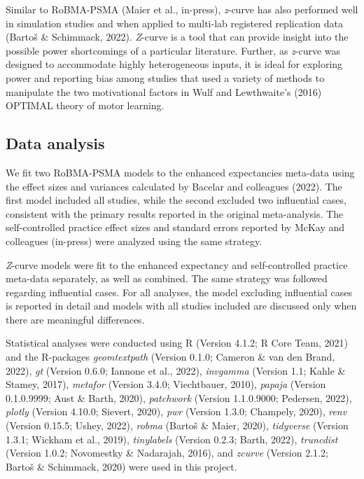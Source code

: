 \documentclass[
  doc, donotrepeattitle,floatsintext]{apa7}
\begin{document}
Similar to RoBMA-PSMA (Maier et al., in-press), \emph{z}-curve has also performed well in simulation studies and when applied to multi-lab registered replication data (Bartoš \& Schimmack, 2022). \emph{Z}-curve is a tool that can provide insight into the possible power shortcomings of a particular literature. Further, as \emph{z}-curve was designed to accommodate highly heterogeneous inputs, it is ideal for exploring power and reporting bias among studies that used a variety of methods to manipulate the two motivational factors in Wulf and Lewthwaite's (2016) OPTIMAL theory of motor learning.

\hypertarget{data-analysis}{%
\subsection{Data analysis}\label{data-analysis}}

We fit two RoBMA-PSMA models to the enhanced expectancies meta-data using the effect sizes and variances calculated by Bacelar and colleagues (2022). The first model included all studies, while the second excluded two influential cases, consistent with the primary results reported in the original meta-analysis. The self-controlled practice effect sizes and standard errors reported by McKay and colleagues (in-press) were analyzed using the same strategy.

\emph{Z}-curve models were fit to the enhanced expectancy and self-controlled practice meta-data separately, as well as combined. The same strategy was followed regarding influential cases. For all analyses, the model excluding influential cases is reported in detail and models with all studies included are discussed only when there are meaningful differences.

Statistical analyses were conducted using R (Version 4.1.2; R Core Team, 2021) and the R-packages \emph{geomtextpath} (Version 0.1.0; Cameron \& van den Brand, 2022), \emph{gt} (Version 0.6.0; Iannone et al., 2022), \emph{invgamma} (Version 1.1; Kahle \& Stamey, 2017), \emph{metafor} (Version 3.4.0; Viechtbauer, 2010), \emph{papaja} (Version 0.1.0.9999; Aust \& Barth, 2020), \emph{patchwork} (Version 1.1.0.9000; Pedersen, 2022), \emph{plotly} (Version 4.10.0; Sievert, 2020), \emph{pwr} (Version 1.3.0; Champely, 2020), \emph{renv} (Version 0.15.5; Ushey, 2022), \emph{robma} (Bartoš \& Maier, 2020), \emph{tidyverse} (Version 1.3.1; Wickham et al., 2019), \emph{tinylabels} (Version 0.2.3; Barth, 2022), \emph{truncdist} (Version 1.0.2; Novomestky \& Nadarajah, 2016), and \emph{zcurve} (Version 2.1.2; Bartoš \& Schimmack, 2020) were used in this project.
\end{document}
